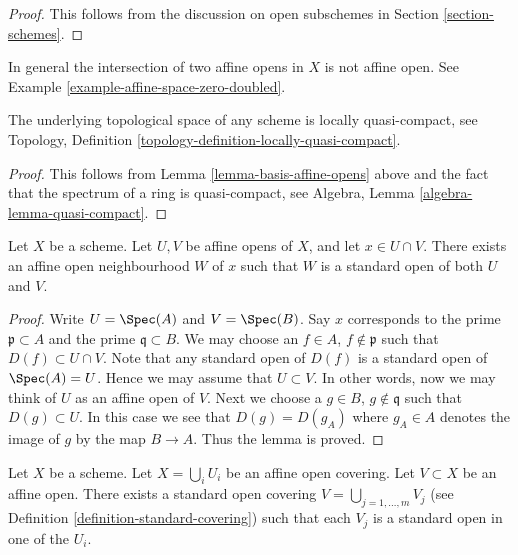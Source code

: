 \begin{proof}
This follows from the discussion on open subschemes
in Section \ref{section-schemes}.
\end{proof}

\begin{remark}
\label{remark-intersection-affine-opens}
In general the intersection of two affine opens in $X$
is not affine open. See Example \ref{example-affine-space-zero-doubled}.
\end{remark}

\begin{lemma}
\label{lemma-locally-quasi-compact}
The underlying topological space of any scheme is
locally quasi-compact, see
Topology, Definition \ref{topology-definition-locally-quasi-compact}.
\end{lemma}

\begin{proof}
This follows from Lemma \ref{lemma-basis-affine-opens} above
and the fact that the spectrum of a ring is quasi-compact, see
Algebra, Lemma \ref{algebra-lemma-quasi-compact}.
\end{proof}

\begin{lemma}
\label{lemma-standard-open-two-affines}
Let $X$ be a scheme.
Let $U, V$ be affine opens of $X$, and let $x \in U \cap V$.
There exists an affine open neighbourhood $W$ of $x$
such that $W$ is a standard open of both $U$ and $V$.
\end{lemma}

\begin{proof}
Write $U = \Spec(A)$ and $V = \Spec(B)$.
Say $x$ corresponds to the prime $\mathfrak p \subset A$
and the prime $\mathfrak q \subset B$.
We may choose an $f \in A$, $f \not \in \mathfrak p$ such that
$D(f) \subset U \cap V$. Note that any standard open of $D(f)$
is a standard open of $\Spec(A) = U$. Hence we may assume
that $U \subset V$. In other words, now we may think of $U$
as an affine open of $V$. Next we choose a
$g \in B$, $g \not \in \mathfrak q$ such that
$D(g) \subset U$. In this case we see that $D(g) = D(g_A)$
where $g_A \in A$ denotes the image of $g$ by the map $B \to A$.
Thus the lemma is proved.
\end{proof}

\begin{lemma}
\label{lemma-good-subcover}
Let $X$ be a scheme.
Let $X = \bigcup_i U_i$ be an affine open covering.
Let $V \subset X$ be an affine open.
There exists a standard open covering
$V = \bigcup_{j = 1, \ldots, m} V_j$ (see
Definition \ref{definition-standard-covering})
such that each $V_j$ is a standard open in one of the $U_i$.
\end{lemma}


